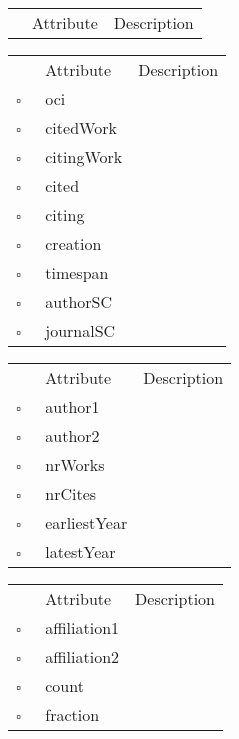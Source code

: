 \begin{table}
\caption{Book  }

\begin{longtable}{llp{8cm}}
& Attribute & Description \\
\end{longtable}
\label{attr:Book}
\end{table}

\begin{table}
\caption{Citation  }

\begin{longtable}{llp{8cm}}
& Attribute & Description \\
$\square$\ & oci &  \\
$\square$\ & citedWork &  \\
$\square$\ & citingWork &  \\
$\square$\ & cited &  \\
$\square$\ & citing &  \\
$\square$\ & creation &  \\
$\square$\ & timespan &  \\
$\square$\ & authorSC &  \\
$\square$\ & journalSC &  \\
\end{longtable}
\label{attr:Citation}
\end{table}

\begin{table}
\caption{Coauthor  }

\begin{longtable}{llp{8cm}}
& Attribute & Description \\
$\square$\ & author1 &  \\
$\square$\ & author2 &  \\
$\square$\ & nrWorks &  \\
$\square$\ & nrCites &  \\
$\square$\ & earliestYear &  \\
$\square$\ & latestYear &  \\
\end{longtable}
\label{attr:Coauthor}
\end{table}

\begin{table}
\caption{CollabCount  }

\begin{longtable}{llp{8cm}}
& Attribute & Description \\
$\square$\ & affiliation1 &  \\
$\square$\ & affiliation2 &  \\
$\square$\ & count &  \\
$\square$\ & fraction &  \\
\end{longtable}
\label{attr:CollabCount}
\end{table}


